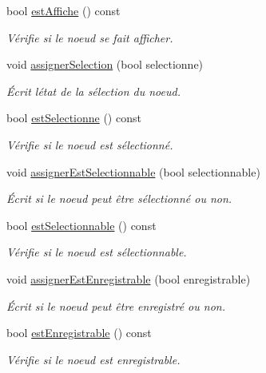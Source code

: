 \begin{DoxyCompactItemize}
bool \hyperlink{group__inf2990_ga07fc02e86d59ccd2680f9e5f5b8e373d}{est\+Affiche} () const 
\begin{DoxyCompactList}\small\item\em Vérifie si le noeud se fait afficher. \end{DoxyCompactList}\item 
void \hyperlink{group__inf2990_ga0f39647390d357d8662a870f0c76242c}{assigner\+Selection} (bool selectionne)
\begin{DoxyCompactList}\small\item\em Écrit l\textquotesingle{}état de la sélection du noeud. \end{DoxyCompactList}\item 
bool \hyperlink{group__inf2990_ga8fb7a3313ce4d361ef7ec8e45ba8add5}{est\+Selectionne} () const 
\begin{DoxyCompactList}\small\item\em Vérifie si le noeud est sélectionné. \end{DoxyCompactList}\item 
void \hyperlink{group__inf2990_ga397add0bac7ec3b842598a2085990b7d}{assigner\+Est\+Selectionnable} (bool selectionnable)
\begin{DoxyCompactList}\small\item\em Écrit si le noeud peut être sélectionné ou non. \end{DoxyCompactList}\item 
bool \hyperlink{group__inf2990_gaa3f3a34571af62de0da5db2d8f54f690}{est\+Selectionnable} () const 
\begin{DoxyCompactList}\small\item\em Vérifie si le noeud est sélectionnable. \end{DoxyCompactList}\item 
void \hyperlink{group__inf2990_gabb7f3756a4094dc588690126ec0703d3}{assigner\+Est\+Enregistrable} (bool enregistrable)
\begin{DoxyCompactList}\small\item\em Écrit si le noeud peut être enregistré ou non. \end{DoxyCompactList}\item 
bool \hyperlink{group__inf2990_ga6a6af3639f1b4e3e33a126703376dcec}{est\+Enregistrable} () const 
\begin{DoxyCompactList}\small\item\em Vérifie si le noeud est enregistrable. \end{DoxyCompactList}\item 

\end{DoxyCompactItemize}
